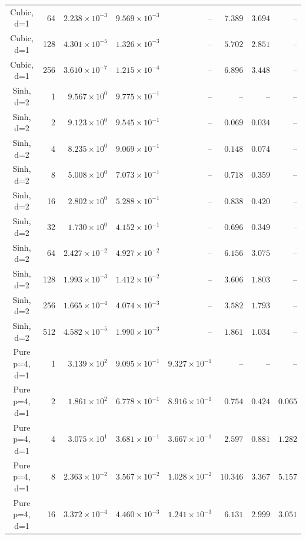 \begin{longtable}{@{}crrrrrrr@{}}
Cubic, d=1 & 64 & $2.238\!\times\!10^{-3}$ & $9.569\!\times\!10^{-3}$ & -- & $7.389$ & $3.694$ & -- \\
Cubic, d=1 & 128 & $4.301\!\times\!10^{-5}$ & $1.326\!\times\!10^{-3}$ & -- & $5.702$ & $2.851$ & -- \\
Cubic, d=1 & 256 & $3.610\!\times\!10^{-7}$ & $1.215\!\times\!10^{-4}$ & -- & $6.896$ & $3.448$ & -- \\
Sinh, d=2 & 1 & $9.567\!\times\!10^{0}$ & $9.775\!\times\!10^{-1}$ & -- & -- & -- & -- \\
Sinh, d=2 & 2 & $9.123\!\times\!10^{0}$ & $9.545\!\times\!10^{-1}$ & -- & $0.069$ & $0.034$ & -- \\
Sinh, d=2 & 4 & $8.235\!\times\!10^{0}$ & $9.069\!\times\!10^{-1}$ & -- & $0.148$ & $0.074$ & -- \\
Sinh, d=2 & 8 & $5.008\!\times\!10^{0}$ & $7.073\!\times\!10^{-1}$ & -- & $0.718$ & $0.359$ & -- \\
Sinh, d=2 & 16 & $2.802\!\times\!10^{0}$ & $5.288\!\times\!10^{-1}$ & -- & $0.838$ & $0.420$ & -- \\
Sinh, d=2 & 32 & $1.730\!\times\!10^{0}$ & $4.152\!\times\!10^{-1}$ & -- & $0.696$ & $0.349$ & -- \\
Sinh, d=2 & 64 & $2.427\!\times\!10^{-2}$ & $4.927\!\times\!10^{-2}$ & -- & $6.156$ & $3.075$ & -- \\
Sinh, d=2 & 128 & $1.993\!\times\!10^{-3}$ & $1.412\!\times\!10^{-2}$ & -- & $3.606$ & $1.803$ & -- \\
Sinh, d=2 & 256 & $1.665\!\times\!10^{-4}$ & $4.074\!\times\!10^{-3}$ & -- & $3.582$ & $1.793$ & -- \\
Sinh, d=2 & 512 & $4.582\!\times\!10^{-5}$ & $1.990\!\times\!10^{-3}$ & -- & $1.861$ & $1.034$ & -- \\
Pure p=4, d=1 & 1 & $3.139\!\times\!10^{2}$ & $9.095\!\times\!10^{-1}$ & $9.327\!\times\!10^{-1}$ & -- & -- & -- \\
Pure p=4, d=1 & 2 & $1.861\!\times\!10^{2}$ & $6.778\!\times\!10^{-1}$ & $8.916\!\times\!10^{-1}$ & $0.754$ & $0.424$ & $0.065$ \\
Pure p=4, d=1 & 4 & $3.075\!\times\!10^{1}$ & $3.681\!\times\!10^{-1}$ & $3.667\!\times\!10^{-1}$ & $2.597$ & $0.881$ & $1.282$ \\
Pure p=4, d=1 & 8 & $2.363\!\times\!10^{-2}$ & $3.567\!\times\!10^{-2}$ & $1.028\!\times\!10^{-2}$ & $10.346$ & $3.367$ & $5.157$ \\
Pure p=4, d=1 & 16 & $3.372\!\times\!10^{-4}$ & $4.460\!\times\!10^{-3}$ & $1.241\!\times\!10^{-3}$ & $6.131$ & $2.999$ & $3.051$ \\

\end{longtable}
